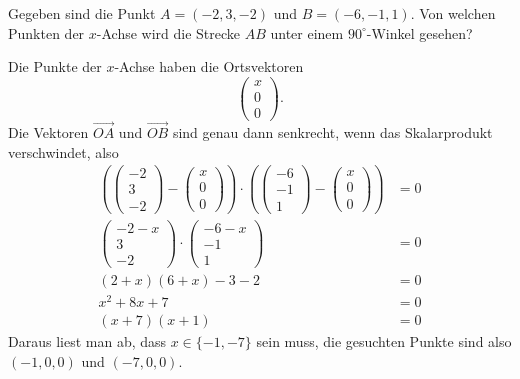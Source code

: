 Gegeben sind die Punkt $A=(-2,3,-2)$ und $B=(-6,-1,1)$. Von welchen Punkten
der $x$-Achse wird die Strecke $AB$ unter einem $90^\circ$-Winkel gesehen?

\begin{loesung}
Die Punkte der $x$-Achse haben die Ortsvektoren
\[
\begin{pmatrix}x\\0\\0\end{pmatrix}
.
\]
Die Vektoren $\overset{\rightarrow}{OA}$ und $\overset{\rightarrow}{OB}$ sind
genau dann senkrecht, wenn das Skalarprodukt verschwindet, also
\begin{align*}
\left(
\begin{pmatrix}-2\\3\\-2\end{pmatrix}
-
\begin{pmatrix}x\\0\\0\end{pmatrix}
\right)\cdot\left(
\begin{pmatrix}-6\\-1\\1\end{pmatrix}
-
\begin{pmatrix}x\\0\\0\end{pmatrix}
\right)
&=0
\\
\begin{pmatrix}-2-x\\3\\-2\end{pmatrix}
\cdot
\begin{pmatrix}-6-x\\-1\\1\end{pmatrix}
&=0
\\
(2+x)(6+x)-3-2&=0\\
x^2+8x+7&=0\\
(x+7)(x+1)&=0
\end{align*}
Daraus liest man ab, dass $x\in\{-1,-7\}$ sein muss, die gesuchten Punkte
sind also $(-1,0,0)$ und $(-7,0,0)$.
\end{loesung}

